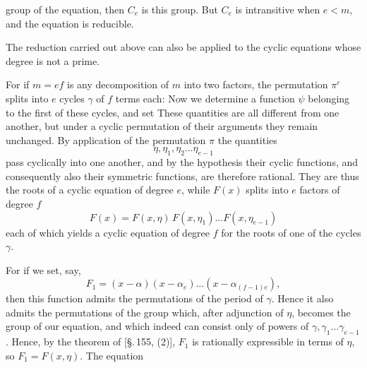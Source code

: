 group of the equation, then $C_e$ is this group. But $C_e$ is intransitive when $e < m$, and the equation is reducible.

The reduction carried out above can also be applied to the cyclic equations whose degree is not a prime.

For if $m = ef$ is any decomposition of $m$ into two factors, the permutation $\pi^e$ splits into $e$ cycles $\gamma$ of $f$ terms each:
Now we determine a function $\psi$ belonging to the first of these cycles, and set
These quantities are all different from one another, but under a cyclic permutation of their arguments they remain unchanged. By application of the permutation $\pi$ the quantities
\[
\eta, \eta_1, \eta_2 \ldots \eta_{e-1}
\]
pass cyclically into one another, and by the hypothesis their cyclic functions, and consequently also their symmetric functions, are therefore rational. They are thus the roots of a cyclic equation of degree $e$, while $F(x)$ splits into $e$ factors of degree $f$
\[
F(x) = F(x, \eta)\, F(x, \eta_1) \ldots F(x, \eta_{e-1})
\]
each of which yields a cyclic equation of degree $f$ for the roots of one of the cycles $\gamma$.

For if we set, say,
\[
F_1 = (x - \alpha)(x - \alpha_e) \ldots (x - \alpha_{(f-1)e}),
\]
then this function admits the permutations of the period of $\gamma$. Hence it also admits the permutations of the group which, after adjunction of $\eta$, becomes the  group of our equation, and which indeed can consist only of powers of $\gamma, \gamma_1 \ldots \gamma_{e-1}$. Hence, by the theorem of  [\S.\,155, (2)], $F_1$ is rationally expressible in terms of $\eta$, so $F_1 = F(x, \eta)$. The equation
